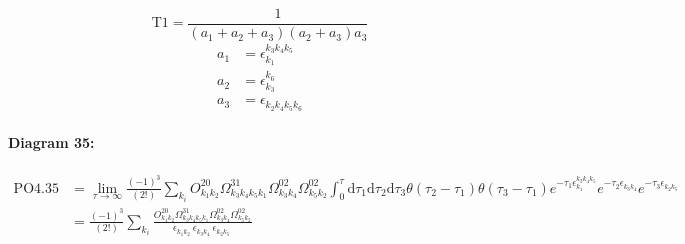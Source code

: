 \documentclass[10pt,a4paper]{article}
\begin{document}
\begin{equation}
\text{T}1 = \frac{1}{(a_1+ a_2+ a_3)(a_2+ a_3)a_3}\end{equation}
\begin{align*}
a_1 &= \epsilon^{k_{3}k_{4}k_{5}}_{k_{1}}\\
a_2 &= \epsilon^{k_{6}}_{k_{3}}\\
a_3 &= \epsilon^{}_{k_{2}k_{4}k_{5}k_{6}}
\end{align*}
\paragraph{Diagram 35:}
\begin{align}
\text{PO}4.35
&= \lim\limits_{\tau \to \infty}\frac{(-1)^3 }{(2!)}\sum_{k_i}O^{20}_{k_{1}k_{2}} \Omega^{31}_{k_{3}k_{4}k_{5}k_{1}} \Omega^{02}_{k_{3}k_{4}} \Omega^{02}_{k_{5}k_{2}} \int_{0}^{\tau}\mathrm{d}\tau_1\mathrm{d}\tau_2\mathrm{d}\tau_3\theta(\tau_2-\tau_1) \theta(\tau_3-\tau_1) e^{-\tau_1 \epsilon^{k_{3}k_{4}k_{5}}_{k_{1}}}e^{-\tau_2 \epsilon^{}_{k_{3}k_{4}}}e^{-\tau_3 \epsilon^{}_{k_{2}k_{5}}}
 \nonumber \\
&= \frac{(-1)^3 }{(2!)}\sum_{k_i}\frac{O^{20}_{k_{1}k_{2}} \Omega^{31}_{k_{3}k_{4}k_{5}k_{1}} \Omega^{02}_{k_{3}k_{4}} \Omega^{02}_{k_{5}k_{2}} }{\epsilon^{}_{k_{1}k_{2}}\ \epsilon^{}_{k_{3}k_{4}}\ \epsilon^{}_{k_{2}k_{5}}\ } 
\end{align}
\end{document}
